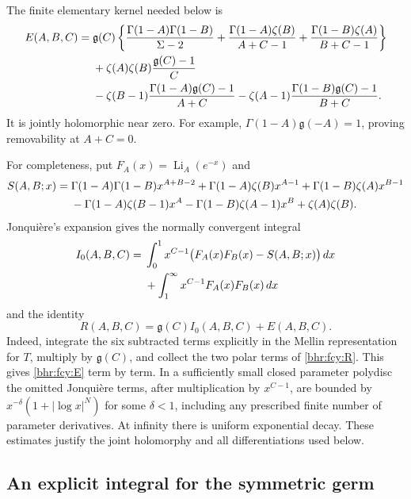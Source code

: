 The finite elementary kernel needed below is
\begin{align}
 E(A,B,C)={}&\mathfrak g(C)\left\{
 \frac{\Gamma(1-A)\Gamma(1-B)}{\Sigma-2}
 +\frac{\Gamma(1-A)\zeta(B)}{A+C-1}
 +\frac{\Gamma(1-B)\zeta(A)}{B+C-1}\right\}\notag\\
 &+\zeta(A)\zeta(B)\frac{\mathfrak g(C)-1}{C}\notag\\
 &-\zeta(B-1)\frac{\Gamma(1-A)\mathfrak g(C)-1}{A+C}
 -\zeta(A-1)\frac{\Gamma(1-B)\mathfrak g(C)-1}{B+C}.
 \label{bhr:fcy:E}
\end{align}
It is jointly holomorphic near zero. For example,
\(\Gamma(1-A)\mathfrak g(-A)=1\), proving removability at \(A+C=0\).

For completeness, put \(F_A(x)=\operatorname{Li}_A(e^{-x})\) and
\begin{align}
 S(A,B;x)={}&\Gamma(1-A)\Gamma(1-B)x^{A+B-2}
 +\Gamma(1-A)\zeta(B)x^{A-1}
 +\Gamma(1-B)\zeta(A)x^{B-1}\notag\\
 &-\Gamma(1-A)\zeta(B-1)x^A
 -\Gamma(1-B)\zeta(A-1)x^B+\zeta(A)\zeta(B).
 \label{bhr:fcy:S}
\end{align}
Jonqui\`ere's expansion \cite[25.12.12]{bhr:DLMFPolylog} gives the
normally convergent integral
\begin{align}
 I_0(A,B,C)={}&\int_0^1x^{C-1}\bigl(F_A(x)F_B(x)-S(A,B;x)\bigr)\,dx
 \notag\\
 &+\int_1^\infty x^{C-1}F_A(x)F_B(x)\,dx
 \label{bhr:fcy:I0}
\end{align}
and the identity
\begin{equation}\label{bhr:fcy:RE}
 R(A,B,C)=\mathfrak g(C)I_0(A,B,C)+E(A,B,C).
\end{equation}
Indeed, integrate the six subtracted terms explicitly in the Mellin
representation for \(T\), multiply by \(\mathfrak g(C)\), and collect the
two polar terms of \eqref{bhr:fcy:R}. This gives
\eqref{bhr:fcy:E} term by term. In a sufficiently small closed parameter
polydisc the omitted Jonqui\`ere terms, after multiplication by
\(x^{C-1}\), are bounded by
\(x^{-\delta}(1+|\log x|^N)\) for some \(\delta<1\), including
any prescribed finite number of parameter derivatives. At infinity
there is uniform exponential decay. These estimates justify the
joint holomorphy and all differentiations used below.

\subsection{An explicit integral for the symmetric germ}

